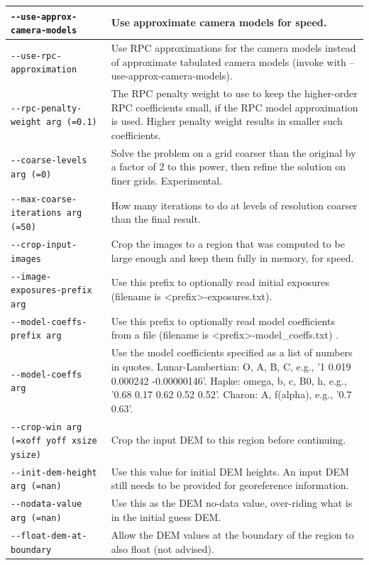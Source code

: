 \begin{longtable}{|l|p{7.5cm}|}
\texttt{-\/-use-approx-camera-models} & Use approximate camera models for speed.\\ \hline
\texttt{-\/-use-rpc-approximation} & Use RPC approximations for the camera models instead of approximate tabulated camera models (invoke with --use-approx-camera-models).\\ \hline
\texttt{-\/-rpc-penalty-weight arg (=0.1)} & The RPC penalty weight to use to keep the higher-order RPC coefficients small, if the RPC model approximation is used. Higher penalty weight results in smaller such coefficients.\\ \hline
\texttt{-\/-coarse-levels arg (=0)} & Solve the problem on a grid coarser than the original by a factor of 2 to this power, then refine the solution on finer grids. Experimental.\\ \hline
\texttt{-\/-max-coarse-iterations arg (=50)} & How many iterations to do at levels of resolution coarser than the final result.\\ \hline
\texttt{-\/-crop-input-images} & Crop the images to a region that was computed to be large enough and keep them fully in memory, for speed.\\ \hline
\texttt{-\/-image-exposures-prefix arg} & Use this prefix to optionally read initial exposures (filename is <prefix>-exposures.txt).\\ \hline
\texttt{-\/-model-coeffs-prefix arg} & Use this prefix to optionally read model coefficients from a file (filename is <prefix>-model\_coeffs.txt) .\\ \hline
\texttt{-\/-model-coeffs arg} & Use the model coefficients specified as a list of numbers in quotes. Lunar-Lambertian: O, A, B, C, e.g., '1 0.019 0.000242 -0.00000146'. Hapke: omega, b, c, B0, h, e.g., '0.68 0.17 0.62 0.52 0.52'. Charon: A, f(alpha), e.g., '0.7 0.63'.\\ \hline
\texttt{-\/-crop-win arg (=xoff yoff xsize ysize)} & Crop the input DEM to this region before continuing.\\ \hline
\texttt{-\/-init-dem-height arg (=nan)} & Use this value for initial DEM heights. An input DEM still needs to be provided for georeference information.\\ \hline
\texttt{-\/-nodata-value arg (=nan)} & Use this as the DEM no-data value, over-riding what is in the initial guess DEM.\\ \hline
\texttt{-\/-float-dem-at-boundary} & Allow the DEM values at the boundary of the region to also float (not advised).\\ \hline

\end{longtable}
